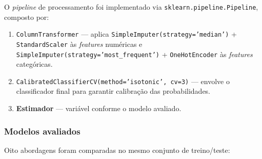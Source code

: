 O \emph{pipeline} de processamento foi implementado via \texttt{sklearn.pipeline.Pipeline}, composto por:

\begin{enumerate}
  \item \texttt{ColumnTransformer} --- aplica \texttt{SimpleImputer(strategy='median')} + \texttt{StandardScaler} às \emph{features} numéricas e \texttt{SimpleImputer(strategy='most\_frequent')} + \texttt{OneHotEncoder} às \emph{features} categóricas.
  \item \texttt{CalibratedClassifierCV(method='isotonic', cv=3)} --- envolve o classificador final para garantir calibração das probabilidades.
  \item \textbf{Estimador} --- variável conforme o modelo avaliado.
\end{enumerate}

\subsubsection{Modelos avaliados}

Oito abordagens foram comparadas no mesmo conjunto de treino/teste:

